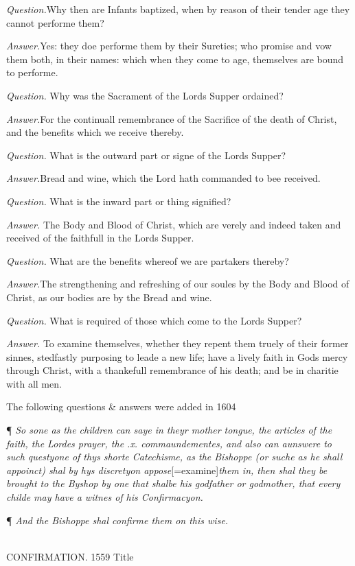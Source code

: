 \emph{Question.}Why then are Infants baptized, when by reason
of their tender age they cannot performe them? 

\emph{Answer.}Yes: they doe performe them by their Sureties;
who promise and vow them both, in their names: which when they come to
age, themselves are bound to performe. 

\emph{Question.} Why was the
Sacrament of the Lords Supper ordained? 

\emph{Answer.}For the continuall remembrance of the Sacrifice
of the death of Christ, and the benefits which we receive thereby.

\emph{} \emph{Question.}
What is the outward part or signe of the Lords Supper? 

\emph{Answer.}Bread and wine, which the Lord hath commanded
to bee received. 

\emph{} \emph{Question.}
What is the inward part or thing signified? 

\emph{Answer.} The Body and
Blood of Christ, which are verely and indeed taken and received of the
faithfull in the Lords Supper. 

\emph{Question.} What are the
benefits whereof we are partakers thereby? 

\emph{Answer.}The strengthening and refreshing of our soules
by the Body and Blood of Christ, as our bodies are by the Bread and wine.

\emph{Question.} What is required
of those which come to the Lords Supper? 

\emph{Answer.} To examine themselves,
whether they repent them truely of their former sinnes, stedfastly purposing
to leade a new life; have a lively faith in Gods mercy through Christ,
with a thankefull remembrance of his death; and be in charitie with all
men.

The following
questions \& answers were added in 1604

¶ \emph{So
sone as the children can saye in theyr mother tongue, the articles of
the faith, the Lordes prayer, the .x. commaundementes, and also can aunswere
to such questyone of thys shorte Catechisme, as the Bishoppe (or suche
as he shall appoinct) shal by hys discretyon appose}[=examine]\emph{them in, then shal they be brought to the Byshop by one that shalbe his
godfather or godmother, that every childe may have a witnes of his Confirmacyon.}

¶
\emph{And the Bishoppe shal confirme them on this wise.}

\emph{}\\
CONFIRMATION.
1559
Title

